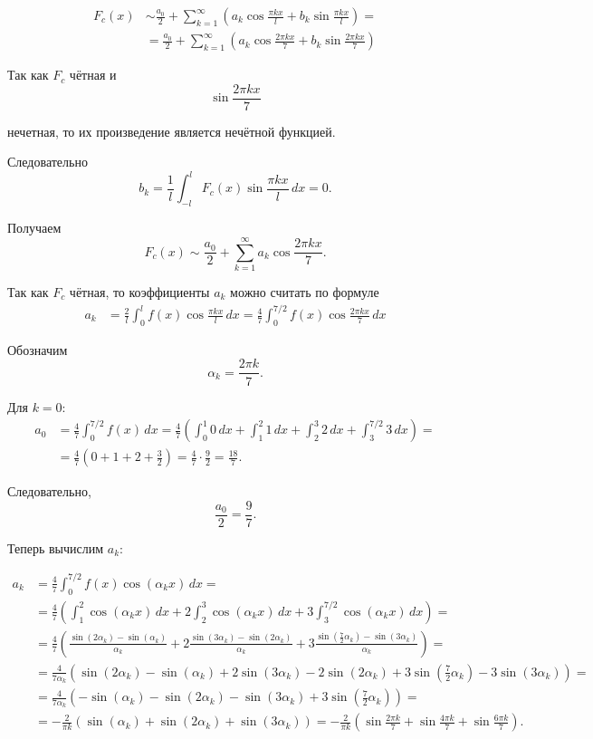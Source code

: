 \documentclass[12pt,a4paper]{article}
\begin{document}
\begin{align*}
F_c(x)&\sim
\frac{a_0}{2}
+
\sum_{k=1}^{\infty}
\left(
a_k\cos\frac{\pi kx}{l}
+
b_k\sin\frac{\pi kx}{l}
\right)
= \\ &=
\frac{a_0}{2}
+
\sum_{k=1}^{\infty}
\left(
a_k\cos\frac{2\pi kx}{7}
+
b_k\sin\frac{2\pi kx}{7}
\right)
\end{align*}

Так как \(F_c\) чётная и
\[
\sin\frac{2\pi kx}{7}
\]

нечетная, то их произведение
является нечётной функцией.

Следовательно
\[
b_k=
\frac1l
\int_{-l}^{l}
F_c(x)\sin\frac{\pi kx}{l}\,dx
=
0.
\]

Получаем
\[
F_c(x)\sim
\frac{a_0}{2}
+
\sum_{k=1}^{\infty}
a_k\cos\frac{2\pi kx}{7}.
\]

Так как \(F_c\) чётная, то коэффициенты \(a_k\) можно считать по формуле
\begin{align*}
a_k
&=
\frac{2}{l}
\int_0^l
f(x)\cos\frac{\pi kx}{l}\,dx
=
\frac47
\int_0^{7/2}
f(x)\cos\frac{2\pi kx}{7}\,dx
\end{align*}

Обозначим
\[
\alpha_k=\frac{2\pi k}{7}.
\]

Для \(k=0\):
\begin{align*}
a_0&=
\frac47
\int_0^{7/2}f(x)\,dx
=
\frac47
\left(
\int_0^1 0\,dx
+
\int_1^2 1\,dx
+
\int_2^3 2\,dx
+
\int_3^{7/2} 3\,dx
\right)
= \\ &=
\frac47
\left(
0+1+2+\frac32
\right)
=
\frac47\cdot\frac92
=
\frac{18}{7}.
\end{align*}

Следовательно,
\[
\frac{a_0}{2}=\frac97.
\]

Теперь вычислим $a_k$:

\begin{align*}
a_k&=
\frac47
\int_0^{7/2}
f(x)\cos(\alpha_k x)\,dx
= \\ &=
\frac47
\left(
\int_1^2 \cos(\alpha_kx)\,dx
+
2\int_2^3 \cos(\alpha_kx)\,dx
+
3\int_3^{7/2} \cos(\alpha_kx)\,dx
\right)
= \\ &=
\frac47
\left(
\frac{\sin(2\alpha_k)-\sin(\alpha_k)}{\alpha_k}
+
2\frac{\sin(3\alpha_k)-\sin(2\alpha_k)}{\alpha_k}
+
3\frac{\sin\left(\frac72\alpha_k\right)-\sin(3\alpha_k)}{\alpha_k}
\right)
= \\ &=
\frac4{7\alpha_k}
\left(
\sin(2\alpha_k)-\sin(\alpha_k)
+
2\sin(3\alpha_k)-2\sin(2\alpha_k)
+
3\sin\left(\frac72\alpha_k\right)-3\sin(3\alpha_k)
\right)
= \\ &=
\frac4{7\alpha_k}
\left(
-\sin(\alpha_k)
-\sin(2\alpha_k)
-\sin(3\alpha_k)
+
3\sin\left(\frac72\alpha_k\right)
\right)
= \\ &=
-\frac2{\pi k}
\left(
\sin(\alpha_k)
+
\sin(2\alpha_k)
+
\sin(3\alpha_k)
\right)
=
-\frac2{\pi k}
\left(
\sin\frac{2\pi k}{7}
+
\sin\frac{4\pi k}{7}
+
\sin\frac{6\pi k}{7}
\right).
\end{align*}
\end{document}
